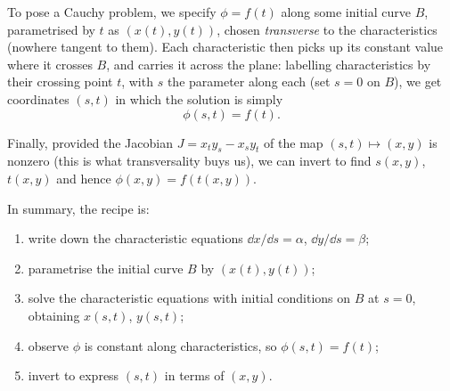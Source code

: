\documentclass[a4paper]{scrartcl}
\begin{document}
To pose a Cauchy problem, we specify $\phi = f(t)$ along some initial curve $B$, parametrised by $t$ as $(x(t), y(t))$, chosen \emph{transverse} to the characteristics (nowhere tangent to them). Each characteristic then picks up its constant value where it crosses $B$, and carries it across the plane: labelling characteristics by their crossing point $t$, with $s$ the parameter along each (set $s = 0$ on $B$), we get coordinates $(s, t)$ in which the solution is simply
$$
\phi(s, t) = f(t).
$$

\begin{center}
\end{center}

Finally, provided the Jacobian $J = x_t y_s - x_s y_t$ of the map $(s,t) \mapsto (x,y)$ is nonzero (this is what transversality buys us), we can invert to find $s(x,y)$, $t(x,y)$ and hence $\phi(x, y) = f(t(x, y))$.

In summary, the recipe is:
\begin{enumerate}
    \item write down the characteristic equations $\dd x/\dd s = \alpha$, $\dd y/\dd s = \beta$;
    \item parametrise the initial curve $B$ by $(x(t), y(t))$;
    \item solve the characteristic equations with initial conditions on $B$ at $s = 0$, obtaining $x(s,t)$, $y(s, t)$;
    \item observe $\phi$ is constant along characteristics, so $\phi(s,t) = f(t)$;
    \item invert to express $(s, t)$ in terms of $(x, y)$.
\end{enumerate}
\end{document}

